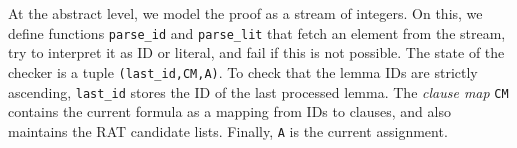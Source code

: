 \documentclass{llncs}
\newcommand{\isai}{\lstinline[language=isabelle,basicstyle=\normalsize\ttfamily\slshape]}
\begin{document}
At the abstract level, we model the proof as a stream of integers. On this, we define functions \isai$parse_id$ and \isai$parse_lit$ that fetch an 
element from the stream, try to interpret it as ID or literal, and fail if this is not possible.
The state of the checker is a tuple \isai$(last_id,CM,A)$. To check that the lemma IDs are strictly ascending, \isai{last_id} stores the ID of the last processed lemma.
The \emph{clause map} \isai{CM} contains the current formula as a mapping from IDs to clauses, and also maintains the RAT candidate lists. Finally, \isai$A$ is the current assignment.


% 
% 
\end{document}
